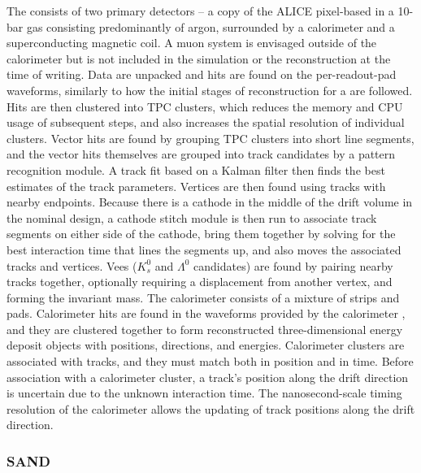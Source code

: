 \documentclass[../main-v1.tex]{subfiles}
\begin{document}

The  consists of two primary detectors -- a copy of the ALICE pixel-based  in a 10-bar gas consisting predominantly of argon, surrounded by a calorimeter and a superconducting magnetic coil.  A muon system is envisaged outside of the calorimeter but is not included in the simulation or the reconstruction at the time of writing.  Data are unpacked and hits are found on the per-readout-pad waveforms, similarly to how the initial stages of reconstruction for a  are followed.  Hits are then clustered into TPC clusters, which reduces the memory and CPU usage of subsequent steps, and also increases the spatial resolution of individual clusters.  Vector hits are found by grouping TPC clusters into short line segments, and the vector hits themselves are grouped into track candidates by a pattern recognition module.  A track fit based on a Kalman filter then finds the best estimates of the track parameters.  Vertices are then found using tracks with nearby endpoints.  Because there is a cathode in the middle of the drift volume in the nominal design, 
a cathode stitch module is then run to associate track segments on either side of the cathode, bring them together by solving for the best interaction time that lines the segments up, and also moves the associated tracks and vertices.  Vees ($K^0_s$ and
$\Lambda^0$ candidates) are found by pairing nearby tracks together, optionally requiring a displacement from another vertex, and forming the invariant mass.  The calorimeter consists of a mixture of strips and pads.  Calorimeter hits are found in the  waveforms provided by the calorimeter , and they are clustered together to form reconstructed three-dimensional energy deposit objects with positions, directions, and energies.  Calorimeter clusters are associated with tracks, and they must match both in position and in time.  Before association with a calorimeter cluster, a track's position along the drift direction is uncertain due to the unknown interaction time.
The nanosecond-scale timing resolution of the calorimeter allows the updating of track positions along the drift direction.

\subsubsection{SAND}
\end{document}
